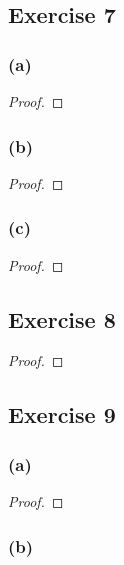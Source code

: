 \documentclass[14pt]{extarticle}
\begin{document}
\subsection{Exercise 7}

\subsubsection{(a)}

\begin{proof}

\end{proof}

\subsubsection{(b)}

\begin{proof}

\end{proof}

\subsubsection{(c)}

\begin{proof}

\end{proof}

\subsection{Exercise 8}

\begin{proof}

\end{proof}

\subsection{Exercise 9}

\subsubsection{(a)}

\begin{proof}

\end{proof}

\subsubsection{(b)}
\end{document}
